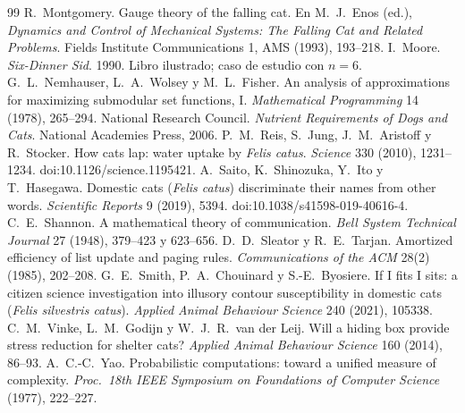\documentclass[11pt,a4paper]{article}
\theoremstyle{plain}
\theoremstyle{definition}
\theoremstyle{remark}
\numberwithin{equation}{section}
\begin{document}
\begin{thebibliography}{99}
 R.~Montgomery. Gauge theory of the falling cat. En M.~J.~Enos (ed.), \emph{Dynamics and Control of Mechanical Systems: The Falling Cat and Related Problems}. Fields Institute Communications 1, AMS (1993), 193--218.
 I.~Moore. \emph{Six-Dinner Sid}. 1990. Libro ilustrado; caso de estudio con $n=6$.
 G.~L.~Nemhauser, L.~A.~Wolsey y M.~L.~Fisher. An analysis of approximations for maximizing submodular set functions, I. \emph{Mathematical Programming} 14 (1978), 265--294.
 National Research Council. \emph{Nutrient Requirements of Dogs and Cats}. National Academies Press, 2006.
 P.~M.~Reis, S.~Jung, J.~M.~Aristoff y R.~Stocker. How cats lap: water uptake by \emph{Felis catus}. \emph{Science} 330 (2010), 1231--1234. doi:10.1126/science.1195421.
 A.~Saito, K.~Shinozuka, Y.~Ito y T.~Hasegawa. Domestic cats (\emph{Felis catus}) discriminate their names from other words. \emph{Scientific Reports} 9 (2019), 5394. doi:10.1038/s41598-019-40616-4.
 C.~E.~Shannon. A mathematical theory of communication. \emph{Bell System Technical Journal} 27 (1948), 379--423 y 623--656.
 D.~D.~Sleator y R.~E.~Tarjan. Amortized efficiency of list update and paging rules. \emph{Communications of the ACM} 28(2) (1985), 202--208.
 G.~E.~Smith, P.~A.~Chouinard y S.-E.~Byosiere. If I fits I sits: a citizen science investigation into illusory contour susceptibility in domestic cats (\emph{Felis silvestris catus}). \emph{Applied Animal Behaviour Science} 240 (2021), 105338.
 C.~M.~Vinke, L.~M.~Godijn y W.~J.~R.~van der Leij. Will a hiding box provide stress reduction for shelter cats? \emph{Applied Animal Behaviour Science} 160 (2014), 86--93.
 A.~C.-C.~Yao. Probabilistic computations: toward a unified measure of complexity. \emph{Proc.\ 18th IEEE Symposium on Foundations of Computer Science} (1977), 222--227.
\end{thebibliography}
\end{document}
